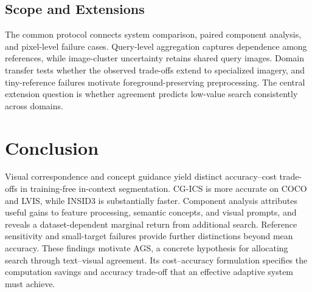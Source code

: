 \subsection{Scope and Extensions}
The common protocol connects system comparison, paired component analysis, and pixel-level failure cases. Query-level aggregation captures dependence among references, while image-cluster uncertainty retains shared query images. Domain transfer tests whether the observed trade-offs extend to specialized imagery, and tiny-reference failures motivate foreground-preserving preprocessing. The central extension question is whether agreement predicts low-value search consistently across domains.

\section{Conclusion}
Visual correspondence and concept guidance yield distinct accuracy--cost trade-offs in training-free in-context segmentation. CG-ICS is more accurate on COCO and LVIS, while INSID3 is substantially faster. Component analysis attributes useful gains to feature processing, semantic concepts, and visual prompts, and reveals a dataset-dependent marginal return from additional search. Reference sensitivity and small-target failures provide further distinctions beyond mean accuracy. These findings motivate AGS, a concrete hypothesis for allocating search through text--visual agreement. Its cost--accuracy formulation specifies the computation savings and accuracy trade-off that an effective adaptive system must achieve.
